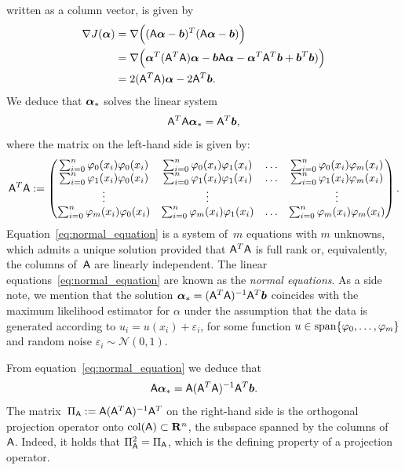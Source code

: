 written as a column vector, is given by
\begin{align*}
    \nabla J(\mathbf{\boldsymbol{\alpha}})
    &= \nabla \Bigl( (\mathsf A \mathbf{\boldsymbol{\alpha}} - \mathbf{\boldsymbol{b}})^T (\mathsf A \mathbf{\boldsymbol{\alpha}} - \mathbf{\boldsymbol{b}}) \Bigr) \\
    &= \nabla \Bigl( \mathbf{\boldsymbol{\alpha}}^T (\mathsf A^T \mathsf A) \mathbf{\boldsymbol{\alpha}} - \mathbf{\boldsymbol{b}} \mathsf A  \mathbf{\boldsymbol{\alpha}} - \mathbf{\boldsymbol{\alpha}}^T \mathsf A^T \mathbf{\boldsymbol{b}} + \mathbf{\boldsymbol{b}}^T \mathbf{\boldsymbol{b}}) \Bigr) \\
    &= 2 (\mathsf A^T \mathsf A) \mathbf{\boldsymbol{\alpha}} - 2 \mathsf A^T \mathbf{\boldsymbol{b}}.
\end{align*}
We deduce that $\mathbf{\boldsymbol{\alpha}}_*$ solves the linear system
\begin{equation}
    \label{eq:normal_equation}
    \mathsf A^T \mathsf A \mathbf{\boldsymbol{\alpha}}_* = \mathsf A^T \mathbf{\boldsymbol{b}},
\end{equation}
where the matrix on the left-hand side is given by:
\[
    \mathsf A^T \mathsf A :=
    \begin{pmatrix}
        \sum_{i=0}^{n} \varphi_0(x_i) \varphi_0(x_i) & \sum_{i=0}^{n} \varphi_0(x_i) \varphi_1(x_i) & \hdots & \sum_{i=0}^{n} \varphi_0(x_i) \varphi_m(x_i) \\
        \sum_{i=0}^{n} \varphi_1(x_i) \varphi_0(x_i) & \sum_{i=0}^{n} \varphi_1(x_i) \varphi_1(x_i) & \hdots & \sum_{i=0}^{n} \varphi_1(x_i) \varphi_m(x_i) \\
        \vdots & \vdots & & \vdots \\
        \sum_{i=0}^{n} \varphi_m(x_i) \varphi_0(x_i) & \sum_{i=0}^{n} \varphi_m(x_i) \varphi_1(x_i) & \hdots & \sum_{i=0}^{n} \varphi_m(x_i) \varphi_m(x_i)
    \end{pmatrix}.
\]
Equation~\eqref{eq:normal_equation} is a system of~$m$ equations with $m$ unknowns,
which admits a unique solution provided that $\mathsf A^T \mathsf A$ is full rank or,
equivalently, the columns of~$\mathsf A$ are linearly independent.
The linear equations~\eqref{eq:normal_equation} are known as the \emph{normal equations}.
As a side note,
we mention that
the solution $\mathbf{\boldsymbol{\alpha}}_* = (\mathsf A^T \mathsf A)^{-1} \mathsf A^T \mathbf{\boldsymbol{b}}$
coincides with the maximum likelihood estimator for $\alpha$ under the assumption that the data is generated according to
$u_i = u(x_i) + \varepsilon_i$, for some function $u \in \operatorname{span} \{\varphi_0, \dotsc, \varphi_m\}$
and random noise $\varepsilon_i \sim \mathcal N(0, 1)$.

\begin{remark}
From equation~\eqref{eq:normal_equation} we deduce that
\[
    \mathsf A \mathbf{\boldsymbol{\alpha}}_* = \mathsf A (\mathsf A^T \mathsf A)^{-1} \mathsf A^T \mathbf{\boldsymbol{b}}.
\]
The matrix~$\Pi_{\mathsf A} := \mathsf A (\mathsf A^T \mathsf A)^{-1} \mathsf A^T$ on the right-hand side is the orthogonal projection operator onto $\operatorname{col}(\mathsf A) \subset \mathbf R^n$,
the subspace spanned by the columns of~$\mathsf A$.
Indeed, it holds that $\Pi_{\mathsf A}^2 = \Pi_{\mathsf A}$,
which is the defining property of a projection operator.
\end{remark}

